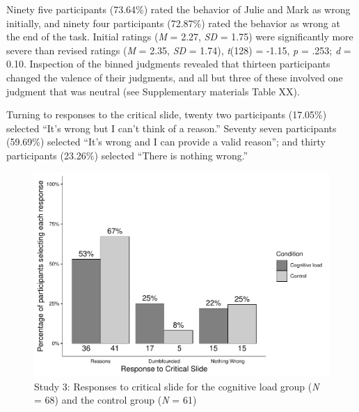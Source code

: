 \documentclass[
  american,
  man,floatsintext]{apa7}
\begin{document}
Ninety five participants (73.64\%) rated the behavior of Julie and Mark as wrong initially, and ninety four participants (72.87\%) rated the behavior as wrong at the end of the task. Initial ratings (\emph{M} = 2.27, \emph{SD} = 1.75) were significantly more severe than revised ratings (\emph{M} = 2.35, \emph{SD} = 1.74), \emph{t}(128) = -1.15, \emph{p} = .253; \emph{d} = 0.10. Inspection of the binned judgments revealed that thirteen participants changed the valence of their judgments, and all but three of these involved one judgment that was neutral (see Supplementary materials Table XX).

Turning to responses to the critical slide, twenty two participants (17.05\%) selected ``It's wrong but I can't think of a reason.'' Seventy seven participants (59.69\%) selected ``It's wrong and I can provide a valid reason''; and thirty participants (23.26\%) selected ``There is nothing wrong.''

\newpage

\begin{figure}
\centering
\includegraphics{cog_load_in_chunks_files/figure-latex/S3ch5S3fig2criticalcondition-1.pdf}
\caption{\label{fig:S3ch5S3fig2criticalcondition}Study 3: Responses to critical slide for the cognitive load group (\emph{N} = 68) and the control group (\emph{N} = 61)}
\end{figure}
\end{document}
